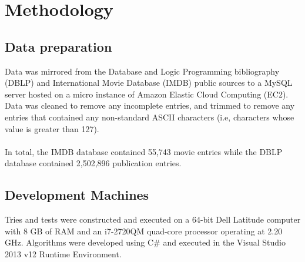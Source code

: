 \documentclass[pdftex,12pt,letter]{article}
\begin{document}
\section{Methodology}
\subsection{Data preparation}
Data was mirrored from the Database and Logic Programming bibliography (DBLP) and International Movie Database (IMDB) public sources to a MySQL server hosted on a micro instance of Amazon Elastic Cloud Computing (EC2). Data was cleaned to remove any incomplete entries, and trimmed to remove any entries that contained any non-standard ASCII characters (i.e, characters whose value is greater than 127).\\
\\
In total, the IMDB database contained 55,743 movie entries while the DBLP database contained 2,502,896 publication entries.


\subsection{Development Machines}
Tries and tests were constructed and executed on a 64-bit Dell Latitude computer with 8 GB of RAM and an i7-2720QM quad-core processor operating at 2.20 GHz. Algorithms were developed using C\# and executed in the Visual Studio 2013 v12 Runtime Environment. 
\end{document}
